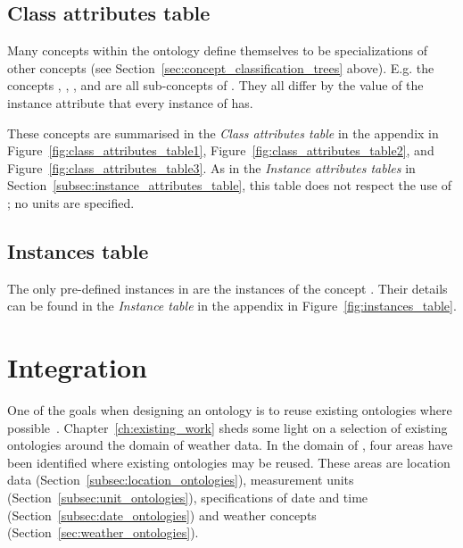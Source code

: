 \subsection{Class attributes table}
\label{subsec:class_attributes_table}

Many concepts within the \smarthomeweather ontology define themselves to be specializations of other concepts (see Section~\ref{sec:concept_classification_trees} above). E.g. the concepts , , ,  and  are all sub-concepts of . They all differ by the value of the instance attribute  that every instance of  has.

These concepts are summarised in the \emph{Class attributes table} in the appendix in Figure~\ref{fig:class_attributes_table1}, Figure~\ref{fig:class_attributes_table2}, and Figure~\ref{fig:class_attributes_table3}. As in the \emph{Instance attributes tables} in Section~\ref{subsec:instance_attributes_table}, this table does not respect the use of \muo; no units are specified.

\subsection{Instances table}
\label{subsec:instances_table}

The only pre-defined instances in \smarthomeweather are the instances of the concept . Their details can be found in the \emph{Instance table} in the appendix in Figure~\ref{fig:instances_table}.

\section{Integration}
\label{sec:integration}

One of the goals when designing an ontology is to reuse existing ontologies where possible~\cite{reuse1,reuse2}. Chapter~\ref{ch:existing_work} sheds some light on a selection of existing ontologies around the domain of weather data. In the domain of \smarthomeweather, four areas have been identified where existing ontologies may be reused. These areas are location data (Section~\ref{subsec:location_ontologies}), measurement units (Section~\ref{subsec:unit_ontologies}), specifications of date and time (Section~\ref{subsec:date_ontologies}) and weather concepts (Section~\ref{sec:weather_ontologies}).

